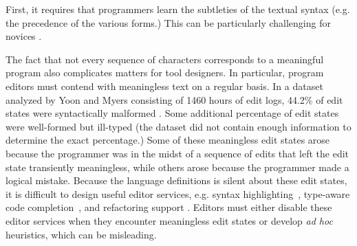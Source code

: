 
First, it requires that programmers learn the subtleties of the textual syntax (e.g. the precedence of the various forms.) This can be particularly challenging for novices \cite{Altadmri:2015:MCI:2676723.2677258}. %

The fact that not every sequence of characters corresponds to a meaningful program also complicates matters for tool designers. In particular, program editors must contend with meaningless text on a regular basis. In a dataset analyzed by Yoon and Myers consisting of 1460 hours of edit logs, 44.2\% of edit states were syntactically malformed \cite{6883030}. Some additional percentage of edit states were well-formed but ill-typed (the dataset did not contain enough information to determine the exact percentage.)  
Some of these meaningless edit states arose because the programmer was in the midst of a sequence of edits that left the edit state transiently meaningless, while others arose because the programmer made a logical mistake. Because the language definitions is silent about these edit states, it is difficult to design useful editor services, e.g. syntax highlighting~\cite{sarkar2015impact}, type-aware code completion~\cite{Mooty:2010:CCC:1915084.1916348,Omar:2012:ACC:2337223.2337324}, and refactoring support \cite{mens2004survey}. Editors must either disable these editor services when they encounter meaningless edit states or develop \emph{ad hoc} heuristics, which can be misleading. %

